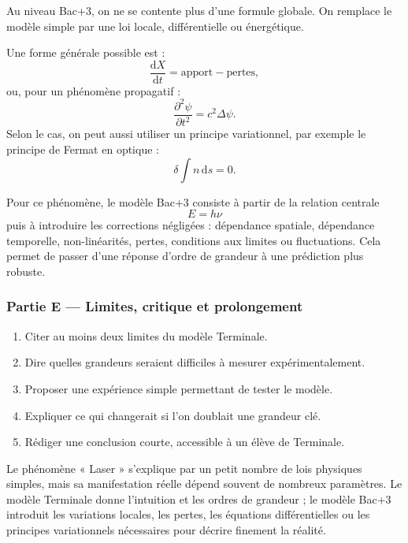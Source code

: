 \documentclass[11pt,a4paper]{article}
\begin{document}
\begin{approfondissementbox}
Au niveau Bac+3, on ne se contente plus d'une formule globale. On remplace le modèle simple par une loi locale, différentielle ou énergétique.

Une forme générale possible est :
\[
\frac{\mathrm d X}{\mathrm dt}=\text{apport}-\text{pertes},
\]
ou, pour un phénomène propagatif :
\[
\frac{\partial^2 \psi}{\partial t^2}=c^2\Delta\psi.
\]
Selon le cas, on peut aussi utiliser un principe variationnel, par exemple le principe de Fermat en optique :
\[
\delta \int n\,\mathrm ds=0.
\]

Pour ce phénomène, le modèle Bac+3 consiste à partir de la relation centrale
\[
E=h\nu
\]
puis à introduire les corrections négligées : dépendance spatiale, dépendance temporelle, non-linéarités, pertes, conditions aux limites ou fluctuations. Cela permet de passer d'une réponse d'ordre de grandeur à une prédiction plus robuste.
\end{approfondissementbox}

\subsubsection*{Partie E — Limites, critique et prolongement}

\begin{enumerate}
  \item Citer au moins deux limites du modèle Terminale.
  \item Dire quelles grandeurs seraient difficiles à mesurer expérimentalement.
  \item Proposer une expérience simple permettant de tester le modèle.
  \item Expliquer ce qui changerait si l'on doublait une grandeur clé.
  \item Rédiger une conclusion courte, accessible à un élève de Terminale.
\end{enumerate}

\begin{corrigebox}
Le phénomène « Laser » s'explique par un petit nombre de lois physiques simples, mais sa manifestation réelle dépend souvent de nombreux paramètres. Le modèle Terminale donne l'intuition et les ordres de grandeur ; le modèle Bac+3 introduit les variations locales, les pertes, les équations différentielles ou les principes variationnels nécessaires pour décrire finement la réalité.
\end{corrigebox}
\end{document}
